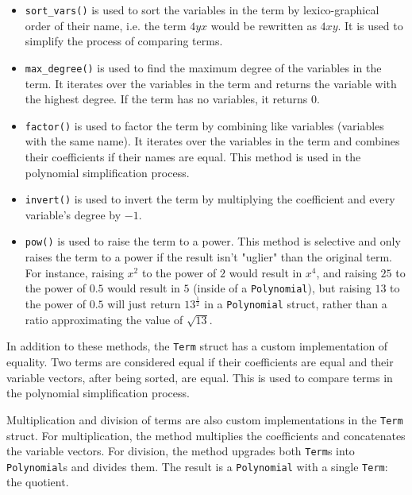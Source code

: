 \begin{itemize}
    \item \verb|sort_vars()| is used to sort the variables in the term by lexico-graphical order of their name, i.e. the term $4yx$ would be rewritten as $4xy$. It is used to simplify the process of comparing terms.
    \item \verb|max_degree()| is used to find the maximum degree of the variables in the term. It iterates over the variables in the term and returns the variable with the highest degree. If the term has no variables, it returns $0$.
    \item \verb|factor()| is used to factor the term by combining like variables (variables with the same name). It iterates over the variables in the term and combines their coefficients if their names are equal. This method is used in the polynomial simplification process.
    \item \verb|invert()| is used to invert the term by multiplying the coefficient and every variable's degree by $-1$.
    \item \verb|pow()| is used to raise the term to a power. This method is selective and only raises the term to a power if the result isn't "uglier" than the original term. For instance, raising $x^2$ to the power of $2$ would result in $x^4$, and raising $25$ to the power of $0.5$ would result in $5$ (inside of a \verb|Polynomial|), but raising $13$ to the power of $0.5$ will just return $13^{\frac{1}{2}}$ in a \verb|Polynomial| struct, rather than a ratio approximating the value of $\sqrt{13}$.
\end{itemize}



In addition to these methods, the \verb|Term| struct has a custom implementation of equality. Two terms are considered equal if their coefficients are equal and their variable vectors, after being sorted, are equal. This is used to compare terms in the polynomial simplification process.



Multiplication and division of terms are also custom implementations in the \verb|Term| struct. For multiplication, the method multiplies the coefficients and concatenates the variable vectors. For division, the method upgrades both \verb|Term|s into \verb|Polynomial|s and divides them. The result is a \verb|Polynomial| with a single \verb|Term|: the quotient.

